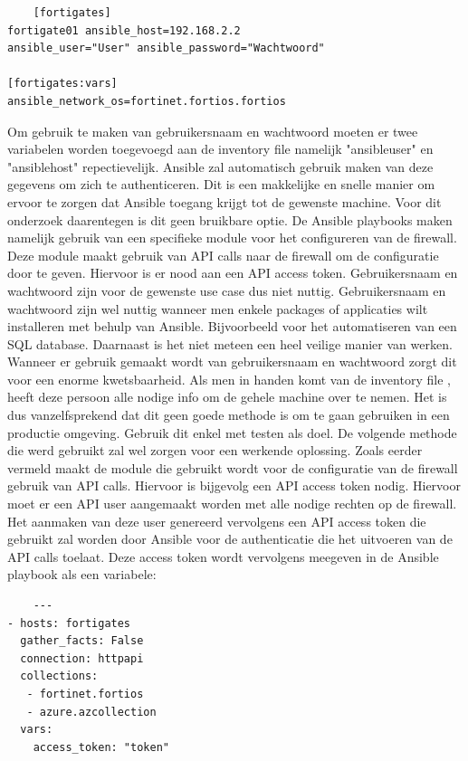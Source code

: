 \begin{lstlisting}
    [fortigates]
fortigate01 ansible_host=192.168.2.2
ansible_user="User" ansible_password="Wachtwoord"

[fortigates:vars]
ansible_network_os=fortinet.fortios.fortios
\end{lstlisting}
Om gebruik te maken van gebruikersnaam en wachtwoord moeten er twee variabelen worden toegevoegd aan de inventory file namelijk "ansible\textunderscore user" en "ansible\textunderscore host" repectievelijk. Ansible zal automatisch gebruik maken van deze gegevens om zich te authenticeren. Dit is een makkelijke en snelle manier om ervoor te zorgen dat Ansible toegang krijgt tot de gewenste machine. Voor dit onderzoek daarentegen is dit geen bruikbare optie. De Ansible playbooks maken namelijk gebruik van een specifieke module voor het configureren van de firewall. Deze module maakt gebruik van API calls naar de firewall om de configuratie door te geven. Hiervoor is er nood aan een API access token. Gebruikersnaam en wachtwoord zijn voor de gewenste use case dus niet nuttig. Gebruikersnaam en wachtwoord zijn wel nuttig wanneer men enkele packages of applicaties wilt installeren met behulp van Ansible. Bijvoorbeeld voor het automatiseren van een SQL database. 
Daarnaast is het niet meteen een heel veilige manier van werken. Wanneer er gebruik gemaakt wordt van gebruikersnaam en wachtwoord zorgt dit voor een enorme kwetsbaarheid. Als men in handen komt van de inventory file , heeft deze persoon alle nodige info om de gehele machine over te nemen. Het is dus vanzelfsprekend dat dit geen goede methode is om te gaan gebruiken in een productie omgeving. Gebruik dit enkel met testen als doel.\newpage
De volgende methode die werd gebruikt zal wel zorgen voor een werkende oplossing. Zoals eerder vermeld maakt de module die gebruikt wordt voor de configuratie van de firewall gebruik van API calls. Hiervoor is bijgevolg een API access token nodig. Hiervoor moet er een API user aangemaakt worden met alle nodige rechten op de firewall. Het aanmaken van deze user genereerd vervolgens een API access token die gebruikt zal worden door Ansible voor de authenticatie die het uitvoeren van de API calls toelaat. Deze access token wordt vervolgens meegeven in de Ansible playbook als een variabele:
\begin{lstlisting}
    ---
- hosts: fortigates
  gather_facts: False
  connection: httpapi                                       
  collections:
   - fortinet.fortios
   - azure.azcollection
  vars:
    access_token: "token"
\end{lstlisting}
